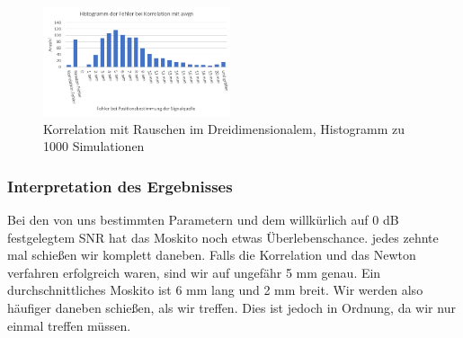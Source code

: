 \begin{figure}
\centering 
\includegraphics[width=0.49\textwidth]{Korrelation mit Rauschen im Dreidimensionalem, Histogramm zu 1000 Simulationen}
\caption{Korrelation mit Rauschen im Dreidimensionalem, Histogramm zu 1000 Simulationen} \label{fig:KorrelationAnalyseMitRauschen Histogramm}
\end{figure}


\subsubsection{Interpretation des Ergebnisses}
Bei den von uns bestimmten Parametern und dem willkürlich auf 0 dB festgelegtem SNR hat das Moskito noch etwas Überlebenschance. jedes zehnte mal schießen wir komplett daneben. Falls die Korrelation und das Newton verfahren erfolgreich waren, sind wir auf ungefähr 5 mm genau. Ein durchschnittliches Moskito ist 6 mm lang und 2 mm breit. Wir werden also häufiger daneben schießen, als wir treffen. Dies ist jedoch in Ordnung, da wir nur einmal treffen müssen.